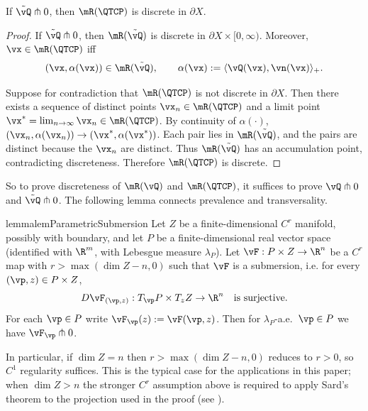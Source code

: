 \begin{lemma}\label{lemma:discrete-preserves}
    If $\tilde{\vQ} \pitchfork 0$, then $\mR(\QTCP)$ is discrete in $\partial X$.
\end{lemma}
\begin{proof}
    If $\tilde{\vQ} \pitchfork 0$, then $\mR(\tilde{\vQ})$ is discrete in
    $\partial X\times[0,\infty)$. Moreover, $\vx\in\mR(\QTCP)$ iff
    \[
    (\vx,\alpha(\vx))\in\mR(\tilde{\vQ}),
    \qquad
    \alpha(\vx):=\langle \vQ(\vx),\vn(\vx)\rangle_+.
    \]

    Suppose for contradiction that $\mR(\QTCP)$ is not discrete in $\partial X$.
    Then there exists a sequence of distinct points $\vx_n\in \mR(\QTCP)$ and a limit point
    $\vx^*=\lim_{n\to\infty} \vx_n\in \mR(\QTCP)$.
    By continuity of $\alpha(\cdot)$,
    $(\vx_n,\alpha(\vx_n))\to(\vx^*,\alpha(\vx^*))$. Each pair lies in
    $\mR(\tilde{\vQ})$, and the pairs are distinct because the $\vx_n$ are
    distinct. Thus $\mR(\tilde{\vQ})$ has an accumulation point, contradicting
    discreteness.
    Therefore $\mR(\QTCP)$ is discrete.
\end{proof}

So to prove discreteness of $\mR(\vQ)$ and $\mR(\QTCP)$, it suffices to prove $\vQ \pitchfork 0$ and $\tilde{\vQ} \pitchfork 0$. The following lemma connects prevalence and transversality.

\begin{restatable}{lemma}{lemParametricSubmersion}\label{lem:parametric_submersion}
Let $Z$ be a finite-dimensional $C^{r}$ manifold, possibly with boundary, and let
$P$ be a finite-dimensional real vector space (identified with $\R^{m}$, with
Lebesgue measure $\lambda_{P}$). Let $\vF:P \times Z\to \R^{n}$ be a $C^{r}$ map
with $r>\max(\dim Z-n,0)$ such that $\vF$ is a submersion, i.e. for every $(\vp,z)\in P\times Z$,
\[
D\vF_{(\vp,z)}:T_{\vp}P\times T_{z}Z\to \R^{n}
\quad\text{is surjective.}
\]
For each $\vp \in P$ write $\vF_{\vp}(z):=\vF(\vp,z)$.
Then for $\lambda_{P}$-a.e.\ $\vp\in P$ we have $\vF_{\vp}\pitchfork 0$.
\end{restatable}

\begin{remark}\label{remark:parametric-regularity}
    In particular, if $\dim Z=n$ then
    $r>\max(\dim Z-n,0)$ reduces to $r>0$, so $C^{1}$ regularity suffices. This
    is the typical case for the applications in this paper; when $\dim Z>n$ the
    stronger $C^{r}$ assumption above is required to apply Sard's theorem to
    the projection used in the proof (see \cite{GuilleminPollack1974}).
\end{remark}

